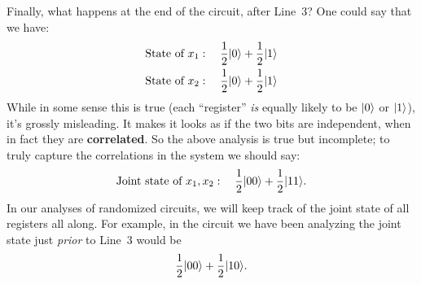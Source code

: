 \documentclass[12pt]{article}
\begin{document}
Finally, what happens at the end of the circuit, after Line~$3$?  One could say that we have:
\begin{gather*}
    \text{State of } x_1: \quad \frac12\ket{0} + \frac12\ket{1} \\
    \text{State of } x_2: \quad \frac12\ket{0} + \frac12\ket{1}
\end{gather*}
While in some sense this is true (each ``register'' \emph{is} equally likely to be $\ket{0}$ or $\ket{1}$), it's grossly misleading. It makes it looks as if the two bits are independent, when in fact they are \textbf{correlated}.  So the above analysis is true but incomplete; to truly capture the correlations in the system we should say:
\[
    \text{Joint state of } x_1, x_2: \quad \frac12\ket{00} + \frac12\ket{11}.
\]
In our analyses of randomized circuits, we will keep track of the joint state of all registers all along.  For example, in the circuit we have been analyzing the joint state just \emph{prior} to Line~$3$ would be
\[
    \frac12\ket{00} + \frac12\ket{10}.
\]
\end{document}
